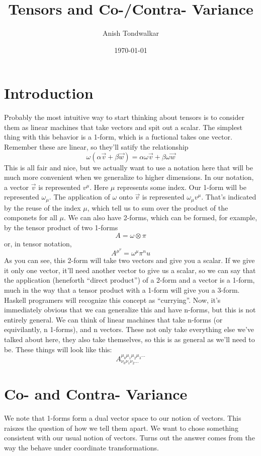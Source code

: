 \documentclass[11pt,notitlepage]{article}
\title{Tensors and Co-/Contra- Variance}
\author{Anish Tondwalkar}
\date{\today}
\begin{document}
\maketitle
\section{Introduction}
Probably the most intuitive way to start thinking about tensors is to consider them as linear machines that take vectors and spit out a scalar. The simplest thing with this behavior is a 1-form, which is a fuctional takes one vector. Remember these are linear, so they'll satify the relationship 
$$ \omega \left( \alpha \vec v + \beta \vec w \right) = 
 \alpha \omega \vec v + \beta \omega \vec w $$
This is all fair and nice, but we actually want to use a notation here that will be much more convenient when we generalize to higher dimensions. In our notation, a vector $\vec v$ is represented $v^\mu$. Here $\mu$ represents some index.
Our 1-form will be represented $\omega_\mu$. The application of $\omega$ onto $\vec v$ is represented $ \omega_\mu v^\mu$. That's indicated by the reuse of the index $\mu$, which tell us to sum over the product of the componets for all $\mu$. 
We can also have 2-forms, which can be formed, for example, by the tensor product of two 1-forms
$$ A = \omega \otimes \pi $$
or, in tensor notation,
$$ A^\mu^\nu = \omega^\mu \pi^nu $$
As you can see, this 2-form will take two vectors and give you a scalar. If we give it only one vector, it'll need another vector to give us a scalar, so we can say that the application (heneforth ``direct product'') of a 2-form and a vector is a 1-form, much in the way that a tensor  product with a 1-form will give you a 3-form. Haskell programers will recognize this concept as ``currying''.
Now, it's immediately obvious that we can generalize this and have n-forms, but this is not entirely general. We can think of linear machines that take n-forms (or equivilantly, n 1-forms), and n vectors. These not only take everything else we've talked about here, they also take themselves, so this is as general as we'll need to be. These things will look like this: 
$$ A^{\mu_0 \mu_1 \mu_2 \mu_3 \ldots}_{\nu_0 \nu_1 \nu_2 \ldots} $$
\section{Co- and Contra- Variance}
We note that 1-forms form a dual vector space to our notion of vectors. This raiszes the question of how we tell them apart. We want to chose something consistent with our usual notion of vectors. Turns out the answer comes from the way the behave under coordinate transformations.  
\end{document}

